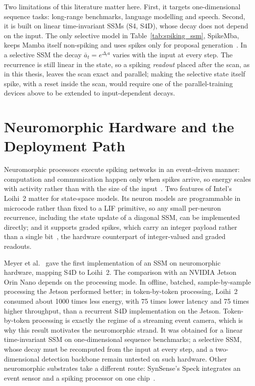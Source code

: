 \documentclass[11pt, a4paper]{report}
\begin{document}
Two limitations of this literature matter here. First, it targets one-dimensional sequence tasks: long-range
benchmarks, language modelling and speech. Second, it is built on linear time-invariant SSMs (S4, S4D), whose
decay does not depend on the input. The only selective model in Table~\ref{tab:spiking_ssm}, SpikeMba, keeps
Mamba itself non-spiking and uses spikes only for proposal generation~\cite{li2024spikemba}. In a selective
SSM the decay $\bar a_t = e^{\Delta_t a}$ varies with the input at every step. The recurrence is still linear
in the state, so a spiking \emph{readout} placed after the scan, as in this thesis, leaves the scan exact and
parallel; making the selective state itself spike, with a reset inside the scan, would require one of the
parallel-training devices above to be extended to input-dependent decays.

\section{Neuromorphic Hardware and the Deployment Path}
\label{sec:neuromorphic_hw}
Neuromorphic processors execute spiking networks in an event-driven manner: computation and
communication happen only when spikes arrive, so energy scales with activity rather than with the size of
the input~\cite{davies2021advancing}. Two features of Intel's Loihi~2 matter for state-space models.
Its neuron models are programmable in microcode rather than fixed to a LIF primitive, so any small
per-neuron recurrence, including the state update of a diagonal SSM, can be implemented directly; and it
supports graded spikes, which carry an integer payload rather than a single bit~\cite{orchard2021efficient},
the hardware counterpart of integer-valued and graded readouts.

Meyer et al.~\cite{meyer2024diagonal} gave the first implementation of an SSM on neuromorphic hardware,
mapping S4D to Loihi~2. The comparison with an NVIDIA Jetson Orin Nano depends on the processing mode. In
offline, batched, sample-by-sample processing the Jetson performed better; in token-by-token processing,
Loihi~2 consumed about 1000 times less energy, with 75 times lower latency and 75 times higher throughput,
than a recurrent S4D implementation on the Jetson. Token-by-token processing is exactly the regime of a
streaming event camera, which is why this result motivates the neuromorphic strand. It was obtained for a
linear time-invariant SSM on one-dimensional sequence benchmarks; a selective SSM, whose decay must be
recomputed from the input at every step, and a two-dimensional detection backbone remain untested on such
hardware. Other neuromorphic substrates take a different route: SynSense's Speck integrates an event sensor
and a spiking processor on one chip~\cite{synsense2026speck}.
\end{document}
